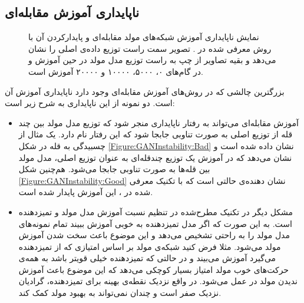 \subsection{ناپایداری آموزش مقابله‌ای} \label{Problem:GANinstablity}
 	\begin{figure}[!htb]
 		{
 			\begin{center}
 				\hspace{1cm}
 				\end{center}
 			\caption[نمایش ناپایداری آموزش شبکه‌های مولد مقابله‌ای و پایدارکردن آن ]{
 				نمایش ناپایداری آموزش شبکه‌های مولد مقابله‌ای و پایدارکردن آن با روش معرفی شده در
 				\cite{Mescheder17TheNumericOfGan}.
 				تصویر سمت راست توزیع داده‌ی اصلی را نشان می‌دهد و بقیه تصاویر از چپ به راست توزیع مدل مولد در حین آموزش و در گام‌های ۰، ۵۰۰۰، ۱۰۰۰۰ و ۲۰۰۰۰ آموزش است.
 			}
 			\label{Figure:GANInstability:BadAndGood}
 		}
 		\end{figure}
بزرگترین چالشی که در روش‌های آموزش مقابله‌ای وجود دارد ناپایداری آموزش آن است.
دو نمونه‌ از این ناپایداری به شرح زیر است:
\begin{itemize}
	\item 
آموزش مقابله‌ای می‌تواند به رفتار ناپایداری منجر شود که توزیع مدل مولد بین چند قله از توزیع اصلی به صورت تناوبی جابجا شود که این رفتار
 نام دارد.
 یک مثال از چسبیدگی به قله در شکل
 \ref{Figure:GANInstability:Bad}
 نشان داده شده است و نشان می‌دهد که در آموزش یک توزیع چندقله‌ای به عنوان توزیع اصلی، مدل مولد بین قله‌ها به صورت تناوبی جابجا می‌شود.
 هم‌چنین شکل
 \ref{Figure:GANInstability:Good}
 نشان دهنده‌ی حالتی است که با تکنیک معرفی شده در
 \cite{Mescheder17TheNumericOfGan}،
 این آموزش پایدار شده است.
 \item
 مشکل دیگر در تکنیک مطرح‌شده در تنظیم نسبت آموزش مدل‌ مولد و تمیزدهنده است. به این صورت که اگر مدل تمیزدهنده به خوبی آموزش ببیند تمام نمونه‌های مدل مولد را به راحتی تشخیص می‌دهد و این موضوع باعث سخت شدن آموزش مولد می‌شود. مثلا فرض کنید شبکه‌ی مولد بر اساس امتیازی که از تمیزدهنده می‌گیرد آموزش می‌بیند و در حالتی که تمیزدهنده خیلی قویتر باشد به همه‌ی حرکت‌های خوب مولد امتیاز بسیار کوچکی می‌دهد که این موضوع باعث آموزش ندیدن مولد در عمل می‌شود. در واقع نزدیک نقطه‌ی بهینه برای تمیزدهنده، گرادیان نزدیک صفر است و چندان نمی‌تواند به بهبود مولد کمک کند.
\end{itemize}
